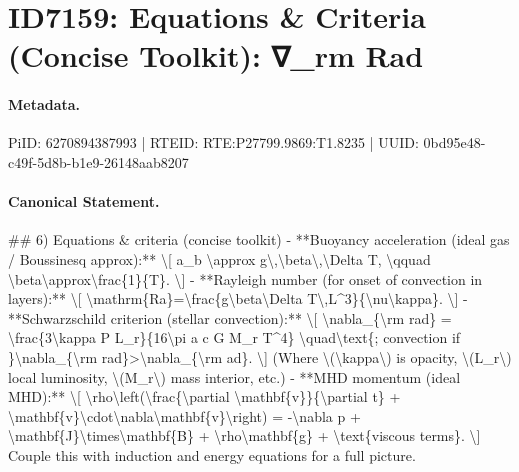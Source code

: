 \section*{ID7159: Equations \& Criteria (Concise Toolkit): ∇\_rm Rad}
\paragraph{Metadata.}
PiID: 6270894387993 | RTEID: RTE:P27799.9869:T1.8235 | UUID: 0bd95e48-c49f-5d8b-b1e9-26148aab8207

\paragraph{Canonical Statement.}
\#\# 6) Equations \& criteria (concise toolkit) - **Buoyancy acceleration (ideal gas / Boussinesq approx):** \textbackslash{}[ a\_b \textbackslash{}approx g\textbackslash{},\textbackslash{}beta\textbackslash{},\textbackslash{}Delta T, \textbackslash{}qquad \textbackslash{}beta\textbackslash{}approx\textbackslash{}frac\{1\}\{T\}. \textbackslash{}] - **Rayleigh number (for onset of convection in layers):** \textbackslash{}[ \textbackslash{}mathrm\{Ra\}=\textbackslash{}frac\{g\textbackslash{}beta\textbackslash{}Delta T\textbackslash{},L\textasciicircum{}3\}\{\textbackslash{}nu\textbackslash{}kappa\}. \textbackslash{}] - **Schwarzschild criterion (stellar convection):** \textbackslash{}[ \textbackslash{}nabla\_\{\textbackslash{}rm rad\} = \textbackslash{}frac\{3\textbackslash{}kappa P L\_r\}\{16\textbackslash{}pi a c G M\_r T\textasciicircum{}4\} \textbackslash{}quad\textbackslash{}text\{; convection if \}\textbackslash{}nabla\_\{\textbackslash{}rm rad\}>\textbackslash{}nabla\_\{\textbackslash{}rm ad\}. \textbackslash{}] (Where \textbackslash{}(\textbackslash{}kappa\textbackslash{}) is opacity, \textbackslash{}(L\_r\textbackslash{}) local luminosity, \textbackslash{}(M\_r\textbackslash{}) mass interior, etc.) - **MHD momentum (ideal MHD):** \textbackslash{}[ \textbackslash{}rho\textbackslash{}left(\textbackslash{}frac\{\textbackslash{}partial \textbackslash{}mathbf\{v\}\}\{\textbackslash{}partial t\} + \textbackslash{}mathbf\{v\}\textbackslash{}cdot\textbackslash{}nabla\textbackslash{}mathbf\{v\}\textbackslash{}right) = -\textbackslash{}nabla p + \textbackslash{}mathbf\{J\}\textbackslash{}times\textbackslash{}mathbf\{B\} + \textbackslash{}rho\textbackslash{}mathbf\{g\} + \textbackslash{}text\{viscous terms\}. \textbackslash{}] Couple this with induction and energy equations for a full picture.

